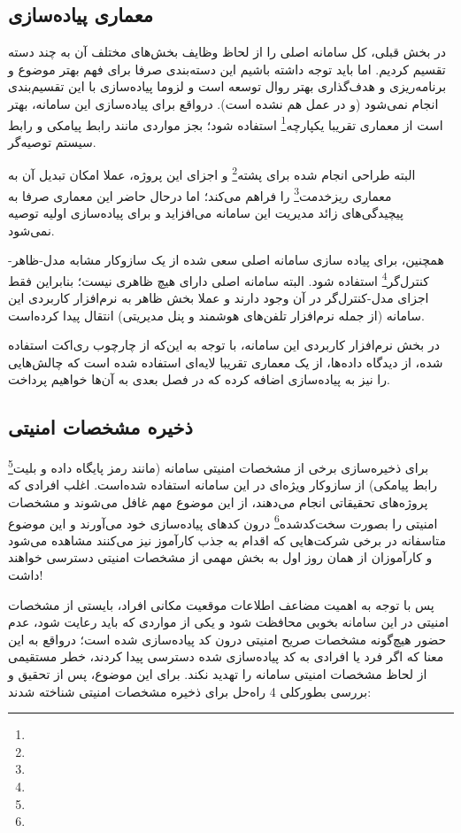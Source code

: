 \newpage

\subsection{معماری پیاده‌سازی}

در بخش قبلی، کل سامانه اصلی را از لحاظ وظایف بخش‌های مختلف آن به چند دسته تقسیم کردیم. اما باید توجه داشته باشیم این دسته‌بندی صرفا برای فهم بهتر موضوع و برنامه‌ریزی و هدف‌گذاری بهتر روال توسعه است و لزوما پیاده‌سازی با این تقسیم‌بندی انجام نمی‌شود (و در عمل هم نشده است). درواقع برای پیاده‌سازی این سامانه، بهتر است از معماری تقریبا یکپارچه\footnote{} استفاده شود؛ بجز مواردی مانند رابط پیامکی و رابط سیستم توصیه‌گر. 

البته طراحی انجام شده برای پشته\footnote{} و اجزای این پروژه، عملا امکان تبدیل آن به معماری ریزخدمت\footnote{} را فراهم می‌کند؛ اما درحال حاضر این معماری صرفا به پیچیدگی‌های زائد مدیریت این سامانه می‌افزاید و برای پیاده‌سازی اولیه توصیه نمی‌شود.

همچنین، برای پیاده سازی سامانه اصلی سعی شده از یک سازوکار مشابه مدل-ظاهر-کنترل‌گر\footnote{} استفاده شود. البته سامانه اصلی دارای هیچ ظاهری نیست؛ بنابراین فقط اجزای مدل-کنترل‌گر در آن وجود دارند و عملا بخش ظاهر به نرم‌افزار کاربردی این سامانه (از جمله نرم‌افزار تلفن‌های هوشمند و پنل مدیریتی) انتقال پیدا کرده‌است.

در بخش نرم‌افزار کاربردی این سامانه، با توجه به این‌که از چارچوب ری‌اکت استفاده شده، از دیدگاه داده‌ها، از یک معماری تقریبا لایه‌ای استفاده شده است که چالش‌هایی را نیز به پیاده‌سازی اضافه کرده که در فصل بعدی به آن‌ها خواهیم پرداخت.

\newpage

\subsection{ذخیره مشخصات امنیتی}

برای ذخیره‌سازی برخی از مشخصات امنیتی سامانه (مانند رمز پایگاه داده و بلیت\footnote{} رابط پیامکی) از سازوکار ویژه‌ای در این سامانه استفاده شده‌است. اغلب افرادی که پروژه‌های تحقیقاتی انجام می‌دهند، از این موضوع مهم غافل می‌شوند و مشخصات امنیتی را بصورت سخت‌کدشده\footnote{} درون کدهای پیاده‌سازی خود می‌آورند و این موضوع متاسفانه در برخی شرکت‌هایی که اقدام به جذب کارآموز نیز می‌کنند مشاهده می‌شود و کارآموزان از همان روز اول به بخش مهمی از مشخصات امنیتی دسترسی خواهند داشت!


پس با توجه به اهمیت مضاعف اطلاعات موقعیت مکانی افراد، بایستی از مشخصات امنیتی در این سامانه بخوبی محافظت شود و یکی از مواردی که باید رعایت شود، عدم حضور هیچ‌گونه مشخصات صریح امنیتی درون کد پیاده‌سازی شده است؛ درواقع به این معنا که اگر فرد یا افرادی به کد پیاده‌سازی شده دسترسی پیدا کردند، خطر مستقیمی از لحاظ مشخصات امنیتی سامانه را تهدید نکند. برای این موضوع، پس از تحقیق و بررسی بطورکلی 4 راه‌حل برای ذخیره مشخصات امنیتی شناخته شدند\cite{secrets}:

